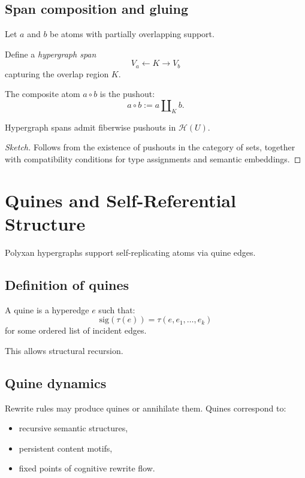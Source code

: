 \subsection{Span composition and gluing}

Let $a$ and $b$ be atoms with partially overlapping support.

Define a \emph{hypergraph span}
\[
V_a \leftarrow K \rightarrow V_b
\]
capturing the overlap region $K$.

The composite atom $a\circ b$ is the pushout:
\[
a\circ b := a \amalg_K b.
\]

\begin{proposition}
Hypergraph spans admit fiberwise pushouts in $\mathscr{H}(U)$.
\end{proposition}

\begin{proof}[Sketch]
Follows from the existence of pushouts in the category of sets, together with
compatibility conditions for type assignments and semantic embeddings.
\end{proof}

\section{Quines and Self-Referential Structure}

Polyxan hypergraphs support self-replicating atoms via quine edges.

\subsection{Definition of quines}

A quine is a hyperedge $e$ such that:
\[
\mathrm{sig}(\tau(e)) = \tau(e,e_1,\dots,e_k)
\]
for some ordered list of incident edges.

This allows structural recursion.

\subsection{Quine dynamics}

Rewrite rules may produce quines or annihilate them. Quines correspond to:

\begin{itemize}
  \item recursive semantic structures,
  \item persistent content motifs,
  \item fixed points of cognitive rewrite flow.
\end{itemize}

